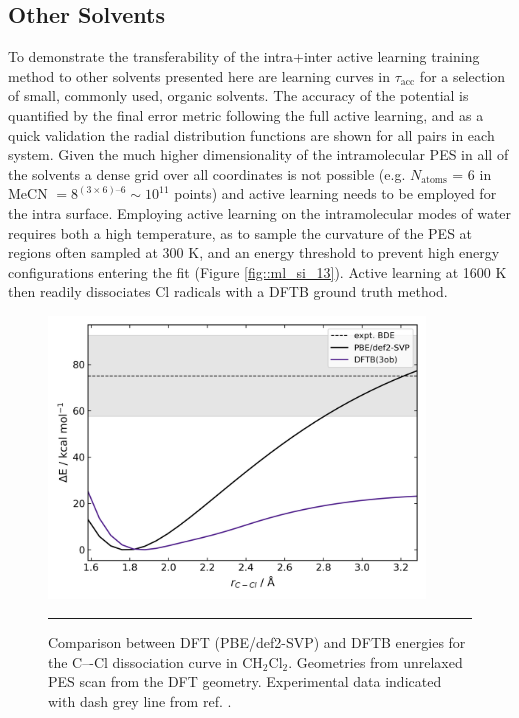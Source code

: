 \documentclass[../../main.tex]{subfiles}
\newcommand{\taua}{$\tau_\text{acc}$ }
\begin{document}
\clearpage
\subsection{Other Solvents}

To demonstrate the transferability of the intra+inter active learning training method to other solvents presented here are learning curves in \taua for a selection of small, commonly used, organic solvents. The accuracy of the potential is quantified by the final error metric following the full active learning, and as a quick validation the radial distribution functions are shown for all pairs in each system. Given the much higher dimensionality of the intramolecular PES in all of the solvents a dense grid over all coordinates is not possible (e.g. $N_\text{atoms}$ = 6 in MeCN $= 8^{(3\times6) – 6} \sim 10^{11}$ points) and active learning needs to be employed for the intra surface. Employing active learning on the intramolecular modes of water requires both a high temperature, as to sample the curvature of the PES at regions often sampled at 300 K, and an energy threshold to prevent high energy configurations entering the fit (Figure \ref{fig::ml_si_13}).
Active learning at 1600 K then readily dissociates Cl radicals with a DFTB ground truth method.


\begin{figure}[h!]
	\vspace{0.4cm}
	\centering
	\includegraphics[width=10cm]{6/gap/figs_si/fig12}
	\vspace{0.2cm}
	\hrule
	\caption{Comparison between DFT (PBE/def2-SVP) and DFTB energies for the C–-Cl dissociation curve in CH${}_2$Cl${}_2$. Geometries from unrelaxed PES scan from the DFT geometry. Experimental data indicated with dash grey line from ref. \cite{Darwent1970}.}
	\label{fig::ml_si_12}
\end{figure}
\end{document}
